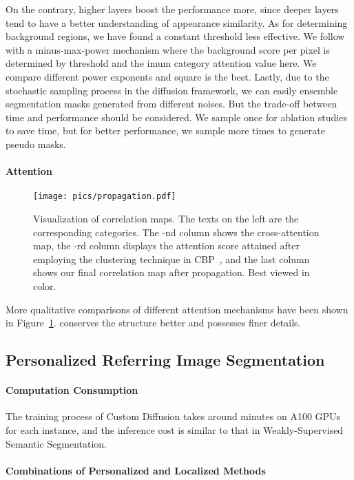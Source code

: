 \documentclass[letterpaper]{article} \usepackage[submission]{aaai24}  \usepackage{times}  \usepackage{helvet}  \usepackage{courier}  \usepackage[hyphens]{url}  \usepackage{graphicx} \urlstyle{rm} \def\UrlFont{\rm}  \usepackage{natbib}  \usepackage{caption} \frenchspacing  \setlength{\pdfpagewidth}{8.5in} \setlength{\pdfpageheight}{11in} \usepackage{algorithm}
\begin{document}
On the contrary, higher  layers boost the performance more, since deeper layers tend to have a better understanding of appearance similarity.
As for determining background regions, we have found a constant threshold less effective.
We follow~\cite{CLIP-ES} with a minus-max-power mechanism where the background score per pixel is determined by threshold  and the imum category attention value here.
We compare different power exponents and square is the best.
Lastly, due to the stochastic sampling process in the diffusion framework, we can easily ensemble segmentation masks generated from different noises.
But the trade-off between time and performance should be considered.
We sample once for ablation studies to save time, but for better performance, we sample more times to generate pseudo masks.

\paragraph{Attention}

\begin{figure}
  \centering
  \texttt{[image: pics/propagation.pdf]}
  \caption{
  Visualization of correlation maps. 
  The texts on the left are the corresponding categories. 
  The -nd column shows the cross-attention map, the -rd column displays the attention score attained after employing the clustering technique in CBP~, and the last column shows our final correlation map after propagation. 
Best viewed in color.}
\label{fig:prop}
\end{figure}
More qualitative comparisons of different attention mechanisms have been shown in Figure~\ref{fig:prop}.
 conserves the structure better and possesses finer details.

\subsection{Personalized Referring Image Segmentation}

\paragraph{Computation Consumption}

The training process of Custom Diffusion takes around  minutes on  A100 GPUs for each instance, and the inference cost is similar to that in Weakly-Supervised Semantic Segmentation.

\paragraph{Combinations of Personalized and Localized Methods}
\end{document}
